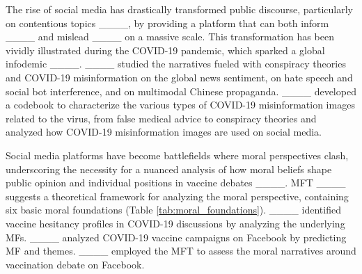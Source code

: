 


The rise of social media has drastically transformed public discourse, particularly on contentious topics ____, by providing a platform that can both inform ____ and mislead ____ on a massive scale. This transformation has been vividly illustrated during the COVID-19 pandemic, which sparked a global infodemic ____. ____ studied the narratives fueled with conspiracy theories and COVID-19 misinformation on the global news sentiment, on hate speech and social bot interference, and on multimodal Chinese propaganda. ____ developed a codebook to characterize the various types of COVID-19 misinformation images related to the virus, from false medical advice to conspiracy theories and analyzed how COVID-19 misinformation images are used on social media.

Social media platforms have become battlefields where moral perspectives clash, underscoring the necessity for a nuanced analysis of how moral beliefs shape public opinion and individual positions in vaccine debates ____. MFT ____ suggests a theoretical framework for analyzing the moral perspective, containing six basic moral foundations (Table \ref{tab:moral_foundations}). ____ identified vaccine hesitancy profiles in COVID-19 discussions by analyzing the  underlying MFs. ____ analyzed COVID-19 vaccine campaigns on Facebook by predicting MF and themes. ____ employed the MFT to assess the moral narratives around vaccination debate on Facebook.
%

